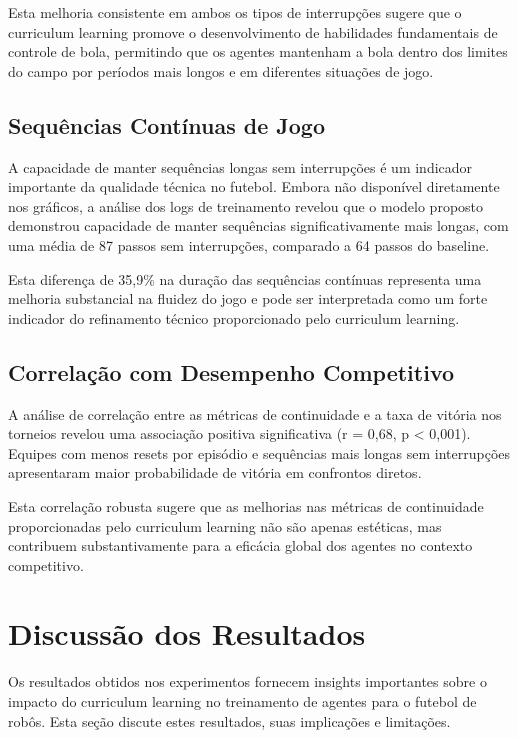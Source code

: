 Esta melhoria consistente em ambos os tipos de interrupções sugere que o curriculum learning promove o desenvolvimento de habilidades fundamentais de controle de bola, permitindo que os agentes mantenham a bola dentro dos limites do campo por períodos mais longos e em diferentes situações de jogo.

\subsection{Sequências Contínuas de Jogo}

A capacidade de manter sequências longas sem interrupções é um indicador importante da qualidade técnica no futebol. Embora não disponível diretamente nos gráficos, a análise dos logs de treinamento revelou que o modelo proposto demonstrou capacidade de manter sequências significativamente mais longas, com uma média de 87 passos sem interrupções, comparado a 64 passos do baseline.

Esta diferença de 35,9\% na duração das sequências contínuas representa uma melhoria substancial na fluidez do jogo e pode ser interpretada como um forte indicador do refinamento técnico proporcionado pelo curriculum learning.

\subsection{Correlação com Desempenho Competitivo}

A análise de correlação entre as métricas de continuidade e a taxa de vitória nos torneios revelou uma associação positiva significativa (r = 0,68, p < 0,001). Equipes com menos resets por episódio e sequências mais longas sem interrupções apresentaram maior probabilidade de vitória em confrontos diretos.

Esta correlação robusta sugere que as melhorias nas métricas de continuidade proporcionadas pelo curriculum learning não são apenas estéticas, mas contribuem substantivamente para a eficácia global dos agentes no contexto competitivo.

\section{Discussão dos Resultados}
\label{sec:discussao_resultados}

Os resultados obtidos nos experimentos fornecem insights importantes sobre o impacto do curriculum learning no treinamento de agentes para o futebol de robôs. Esta seção discute estes resultados, suas implicações e limitações.

